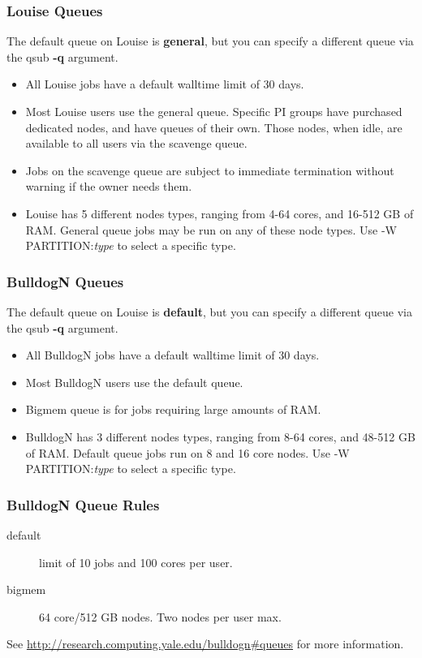 \documentclass[10pt]{beamer}
\begin{document}
\begin{frame}
\frametitle{Louise Queues}
The default queue on Louise is \textbf{general}, but you can specify
a different queue via the qsub \textbf{-q} argument.

\begin{itemize}
\item All Louise jobs have a default walltime limit of 30 days.  
\item Most Louise users use the general queue.  Specific PI groups have purchased dedicated nodes, and have 
queues of their own.  Those nodes, when idle, are available to all users via the scavenge queue.  
\item Jobs on the scavenge queue are subject to immediate termination without warning if the owner needs them.
\item Louise has 5 different nodes types, ranging from 4-64 cores, and 16-512 GB of RAM.  General queue jobs may be run on any
of these node types.  Use -W PARTITION:\textit{type} to select a specific type. 
\end{itemize}

\end{frame}

\begin{frame}
\frametitle{BulldogN Queues}
The default queue on Louise is \textbf{default}, but you can specify
a different queue via the qsub \textbf{-q} argument.

\begin{itemize}
\item All BulldogN jobs have a default walltime limit of 30 days.  
\item Most BulldogN users use the default queue.  
\item Bigmem queue is for jobs requiring large amounts of RAM.
\item BulldogN has 3 different nodes types, ranging from 8-64 cores, and 48-512 GB of RAM.  
Default queue jobs run on 8 and 16 core nodes.
Use -W PARTITION:\textit{type} to select a specific type. 
\end{itemize}

\end{frame}

\begin{frame}
\frametitle{BulldogN Queue Rules}

\begin{description}
\item[default] limit of 10 jobs and 100 cores per user.
\item[bigmem]  64 core/512 GB nodes. Two nodes per user max.

\end{description}
 
See \url{http://research.computing.yale.edu/bulldogn\#queues} for more information.

\end{frame}
\end{document}
